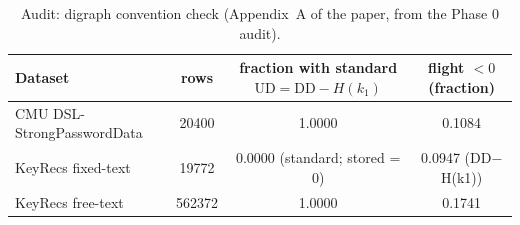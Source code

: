 \begin{table}[t]
\caption{Audit: digraph convention check (Appendix~A of the paper, from the Phase 0 audit).}
\label{tab:audit}
\centering
\small
\begin{tabular}{lccc}
\toprule
Dataset & rows & fraction with standard $\mathrm{UD}=\mathrm{DD}-H(k_1)$ & flight $<0$ (fraction) \\
\midrule
CMU DSL-StrongPasswordData & 20400 & 1.0000 & 0.1084 \\
KeyRecs fixed-text & 19772 & 0.0000 (standard; stored = 0) & 0.0947 (DD$-$H(k1)) \\
KeyRecs free-text & 562372 & 1.0000 & 0.1741 \\
\bottomrule
\end{tabular}
\end{table}
